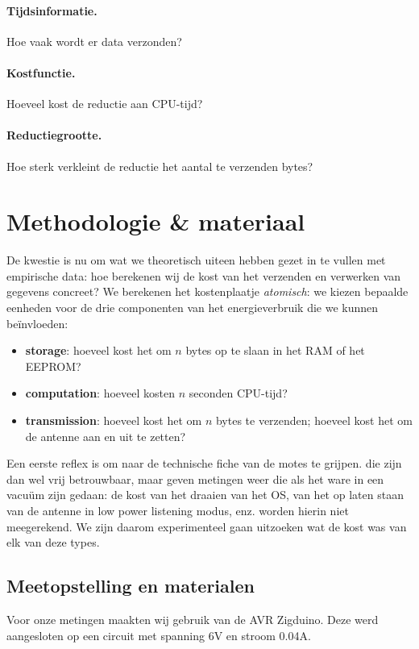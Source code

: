 \documentclass{article}
\begin{document}
\paragraph{Tijdsinformatie.} Hoe vaak wordt er data verzonden?
\paragraph{Kostfunctie.} Hoeveel kost de reductie aan CPU-tijd?
\paragraph{Reductiegrootte.} Hoe sterk verkleint de reductie het aantal te
verzenden bytes?

\section{Methodologie \& materiaal}

De kwestie is nu om wat we theoretisch uiteen hebben gezet in te vullen met
empirische data: hoe berekenen wij de kost van het verzenden en verwerken van
gegevens concreet? We berekenen het kostenplaatje \textit{atomisch}: we kiezen
bepaalde eenheden voor de drie componenten van het energieverbruik die we kunnen
be\"invloeden:

\begin{itemize}
\item \textbf{storage}: hoeveel kost het om $n$ bytes op te slaan in het RAM of
het EEPROM?
\item \textbf{computation}: hoeveel kosten $n$ seconden CPU-tijd?
\item \textbf{transmission}: hoeveel kost het om $n$ bytes te verzenden; hoeveel
kost het om de antenne aan en uit te zetten?
\end{itemize}

Een eerste reflex is om naar de technische fiche van de motes te grijpen. die
zijn dan wel vrij betrouwbaar, maar geven metingen weer die als het ware in een
vacu\"um zijn gedaan: de kost van het draaien van het OS, van het op laten staan
van de antenne in low power listening modus, enz. worden hierin niet
meegerekend. We zijn daarom experimenteel gaan uitzoeken wat de kost was van elk
van deze types.

\subsection{Meetopstelling en materialen}

Voor onze metingen maakten wij gebruik van de AVR Zigduino. Deze werd
aangesloten op een circuit met spanning 6V en stroom 0.04A.
\end{document}
